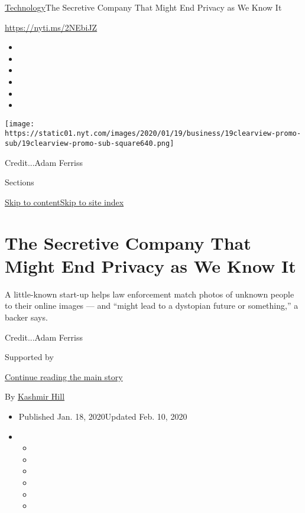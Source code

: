 \href{/section/technology}{Technology}\textbar{}The Secretive Company
That Might End Privacy as We Know It

\url{https://nyti.ms/2NEbiJZ}

\begin{itemize}
\item
\item
\item
\item
\item
\item
\end{itemize}

\texttt{[image: https://static01.nyt.com/images/2020/01/19/business/19clearview-promo-sub/19clearview-promo-sub-square640.png]}

Credit...Adam Ferriss

Sections

\protect\hyperlink{site-content}{Skip to
content}\protect\hyperlink{site-index}{Skip to site index}

\hypertarget{the-secretive-company-that-might-end-privacy-as-we-know-it}{%
\section{The Secretive Company That Might End Privacy as We Know
It}\label{the-secretive-company-that-might-end-privacy-as-we-know-it}}

A little-known start-up helps law enforcement match photos of unknown
people to their online images --- and ``might lead to a dystopian future
or something,'' a backer says.

Credit...Adam Ferriss

Supported by

\protect\hyperlink{after-sponsor}{Continue reading the main story}

By \href{https://www.nytimes.com/by/kashmir-hill}{Kashmir Hill}

\begin{itemize}
\item
  Published Jan. 18, 2020Updated Feb. 10, 2020
\item
  \begin{itemize}
  \item
  \item
  \item
  \item
  \item
  \item
  \end{itemize}
\end{itemize}

